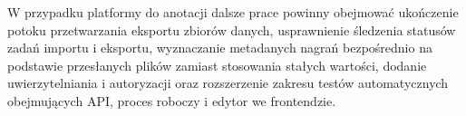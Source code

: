 W przypadku platformy do anotacji dalsze prace powinny obejmować ukończenie
potoku przetwarzania eksportu zbiorów danych, usprawnienie śledzenia statusów
zadań importu i eksportu, wyznaczanie metadanych nagrań bezpośrednio na podstawie
przesłanych plików zamiast stosowania stałych wartości, dodanie uwierzytelniania
 i autoryzacji oraz rozszerzenie zakresu testów automatycznych obejmujących API,
proces roboczy i edytor we frontendzie.

